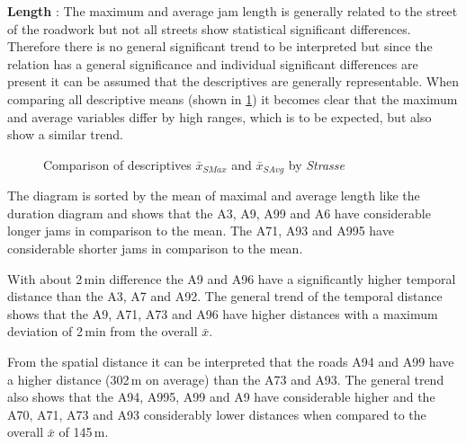 \textbf{Length} : The maximum and average jam length is generally related to the street of the roadwork but not all streets show statistical significant differences. Therefore there is no general significant trend to be interpreted but since the relation has a general significance and individual significant differences are present it can be assumed that the descriptives are generally representable. When comparing all descriptive means (shown in \cref{fig:arbis_summary_Str_spatial}) it becomes clear that the maximum and average variables differ by high ranges, which is to be expected, but also show a similar trend.
\begin{figure}[ht!]
	\data
	\pgfplotstablesort[sort key=means, sort cmp=float >]{\datasorted}{\data}
	\tiny
	\centering
	\caption{Comparison of descriptives $\bar{x}_{SMax}$ and $\bar{x}_{SAvg}$ by \textit{Strasse}}
	\label{fig:arbis_summary_Str_spatial}
\end{figure}
The diagram is sorted by the mean of maximal and average length like the duration diagram and shows that the A3, A9, A99 and A6 have considerable longer jams in comparison to the mean. The A71, A93 and A995 have considerable shorter jams in comparison to the mean.

With about 2\,min difference the A9 and A96 have a significantly higher temporal distance than the A3, A7 and A92. The general trend of the temporal distance shows that the A9, A71, A73 and A96 have higher distances with a maximum deviation of 2\,min from the overall $\bar{x}$.

From the spatial distance it can be interpreted that the roads A94 and A99 have a higher distance (302\,m on average) than the A73 and A93. The general trend also shows that the A94, A995, A99 and A9 have considerable higher and the A70, A71, A73 and A93 considerably lower distances when compared to the overall $\bar{x}$ of 145\,m.

